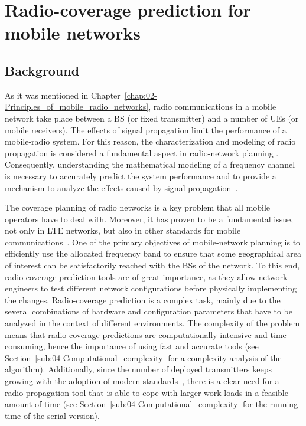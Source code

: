 \section{Radio-coverage prediction for mobile networks \label{sec:04-Radio_coverage_prediction_for_mobile_networks}}


\subsection{Background}

As it was mentioned in Chapter~\ref{chap:02-Principles_of_mobile_radio_networks},
radio communications in a mobile network take place between a BS (or
fixed transmitter) and a number of UEs (or mobile receivers). The
effects of signal propagation limit the performance of a mobile-radio
system. For this reason, the characterization and modeling of radio
propagation is considered a fundamental aspect in radio-network planning
\cite{Ahmad:Studying_different_propagation_models_for_LTE_system:2012}.
Consequently, understanding the mathematical modeling of a frequency
channel is necessary to accurately predict the system performance
and to provide a mechanism to analyze the effects caused by signal
propagation~\cite{Parsons-The_mobile_radio_propagation_channel:2000}.

The coverage planning of radio networks is a key problem that all
mobile operators have to deal with. Moreover, it has proven to be
a fundamental issue, not only in LTE networks, but also in other standards
for mobile communications~\cite{Saleh_On_the_coveraga_extension_in_LTE_networks:2010,Shabbir_Comparison_of_radio_propagation_models:2011,Siomina:Minimum.pilot.power.for.service.coverage,Valcarce_Applying.FDTD.to.the.coverage.prediction.of.WiMAX:2009}.
One of the primary objectives of mobile-network planning is to efficiently
use the allocated frequency band to ensure that some geographical
area of interest can be satisfactorily reached with the BSs of the
network. To this end, radio-coverage prediction tools are of great
importance, as they allow network engineers to test different network
configurations before physically implementing the changes. Radio-coverage
prediction is a complex task, mainly due to the several combinations
of hardware and configuration parameters that have to be analyzed
in the context of different environments. The complexity of the problem
means that radio-coverage predictions are computationally-intensive
and time-consuming, hence the importance of using fast and accurate
tools (see Section~\ref{sub:04-Computational_complexity} for a complexity
analysis of the algorithm). Additionally, since the number of deployed
transmitters keeps growing with the adoption of modern standards~\cite{Saleh_On_the_coveraga_extension_in_LTE_networks:2010},
there is a clear need for a radio-propagation tool that is able to
cope with larger work loads in a feasible amount of time (see Section~\ref{sub:04-Computational_complexity}
for the running time of the serial version).


